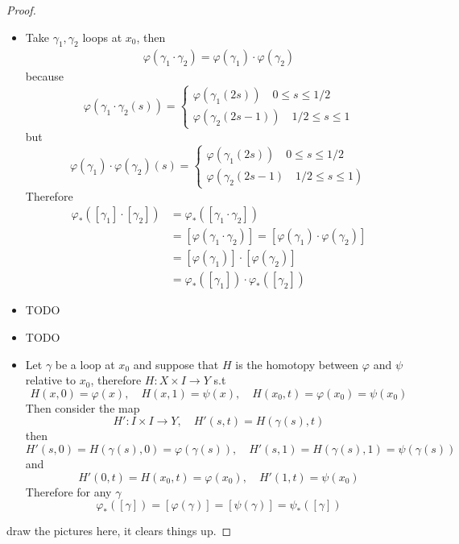 \documentclass[11pt,a4paper]{article}
\theoremstyle{definition}
\theoremstyle{plain}
\theoremstyle{remark}
\newcommand{\1}{\mathbbm{1}}
\begin{document}
\begin{proof}
    \begin{itemize}
        \item Take $\gamma_1, \gamma_2$ loops at $x_0$, then 
        \begin{align*}
            \varphi(\gamma_1 \cdot \gamma_2) = \varphi(\gamma_1) \cdot \varphi(\gamma_2)
        \end{align*}
        because 
        $$\varphi(\gamma_1 \cdot \gamma_2 (s)) = \begin{cases}
            \varphi(\gamma_1 (2s)) \quad 0 \le s \le 1/2 \\
            \varphi(\gamma_2 (2s-1)) \quad 1/2 \le s \le 1
        \end{cases}$$
        but 
        $$\varphi(\gamma_1) \cdot \varphi(\gamma_2) (s) = \begin{cases}
            \varphi(\gamma_1(2s)) \quad 0 \le s \le 1/2 \\
            \varphi(\gamma_2(2s-1) \quad 1/2 \le s \le 1)
        \end{cases}$$
        Therefore 
        \begin{align*}
            \varphi_*([\gamma_1] \cdot [\gamma_2]) &= \varphi_*([\gamma_1 \cdot \gamma_2]) \\
            &= [\varphi(\gamma_1 \cdot \gamma_2)] = [\varphi(\gamma_1) \cdot \varphi(\gamma_2)] \\
            &= [\varphi(\gamma_1)] \cdot [\varphi(\gamma_2)] \\
            &= \varphi_*([\gamma_1]) \cdot \varphi_*([\gamma_2])
        \end{align*}
        \item TODO 
        \item TODO 
        \item Let $\gamma$ be a loop at $x_0$ and suppose that $H$ is the homotopy between $\varphi$ and $\psi$ relative to $x_0$, therefore 
        $H \colon X \times I \to Y$ s.t 
        $$H(x, 0) = \varphi(x), \quad H(x, 1) = \psi(x), \quad H(x_0, t) = \varphi(x_0) = \psi(x_0)$$
        Then consider the map 
        $$H' \colon I \times I \to Y, \quad H'(s, t) = H(\gamma(s), t)$$
        then 
        $$H'(s, 0) = H(\gamma(s), 0) = \varphi(\gamma(s)), \quad H'(s, 1) = H(\gamma(s), 1) = \psi(\gamma(s))$$
        and 
        $$H'(0, t) = H(x_0, t) = \varphi(x_0), \quad H'(1,t) = \psi(x_0)$$
        Therefore for any $\gamma$ 
        $$\varphi_*([\gamma]) = [\varphi(\gamma)] = [\psi(\gamma)] = \psi_*([\gamma])$$
    \end{itemize}
    draw the pictures here, it clears things up. 
\end{proof}
\end{document}
